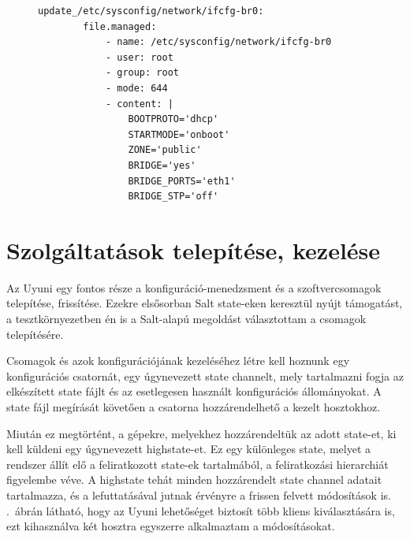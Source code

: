 \begin{figure}[htb]
	\begin{lstlisting}[caption=A hálózati konfiguráció frissítését végző Salt state.,label=lst:vhost-salt-formula-mod]
	update_/etc/sysconfig/network/ifcfg-br0:
		file.managed:
			- name: /etc/sysconfig/network/ifcfg-br0
			- user: root
			- group: root
			- mode: 644
			- content: |
				BOOTPROTO='dhcp'
				STARTMODE='onboot'
				ZONE='public'
				BRIDGE='yes'
				BRIDGE_PORTS='eth1'
				BRIDGE_STP='off'\end{lstlisting}
\end{figure}

\section{Szolgáltatások telepítése, kezelése}
Az Uyuni egy fontos része a konfiguráció-menedzsment és a szoftvercsomagok telepítése, frissítése. Ezekre elsősorban Salt state-eken keresztül nyújt támogatást, a tesztkörnyezetben én is a Salt-alapú megoldást választottam a csomagok telepítésére.

Csomagok és azok konfigurációjának kezeléséhez létre kell hoznunk egy konfigurációs csatornát, egy úgynevezett state channelt, mely tartalmazni fogja az elkészített state fájlt és az esetlegesen használt konfigurációs állományokat. A state fájl megírását követően a csatorna hozzárendelhető a kezelt hosztokhoz.

Miután ez megtörtént, a gépekre, melyekhez hozzárendeltük az adott state-et, ki kell küldeni egy úgynevezett highstate-et. Ez egy különleges state, melyet a rendszer állít elő a feliratkozott state-ek tartalmából, a feliratkozási hierarchiát figyelembe véve. A highstate tehát minden hozzárendelt state channel adatait  tartalmazza, és a lefuttatásával jutnak érvényre a frissen felvett módosítások is. .~ábrán látható, hogy az Uyuni lehetőséget biztosít több kliens kiválasztására is, ezt kihasználva két hosztra egyszerre alkalmaztam a módosításokat.

